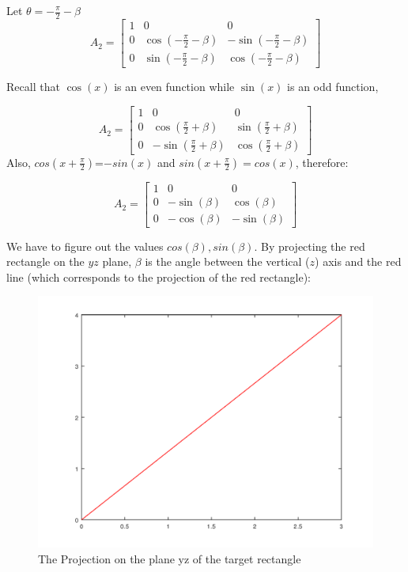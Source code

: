 \documentclass[12pt, letterpaper]{article}
\theoremstyle{statement}
\theoremstyle{statement}
\begin{document}
    Let $\theta=-\frac{\pi}{2}-\beta$
    $$
    A_2=
    \begin{bmatrix}
    1 & 0 & 0\\
    0 & \cos({-\frac{\pi}{2}-\beta}) & -\sin({-\frac{\pi}{2}-\beta}) \\
    0 & \sin({-\frac{\pi}{2}-\beta}) & \cos({-\frac{\pi}{2}-\beta})  
    \end{bmatrix}
    $$
    
    Recall that $\cos(x)$ is an even function while $\sin(x)$ is an odd function,
    
    $$
    A_2=
    \begin{bmatrix}
    1 & 0 & 0\\
    0 & \cos({\frac{\pi}{2}+\beta}) & \sin({\frac{\pi}{2}+\beta}) \\
    0 & -\sin({\frac{\pi}{2}+\beta}) & \cos({\frac{\pi}{2}+\beta})
    \end{bmatrix}
    $$
    Also, $cos(x+\frac{\pi}{2})$=$-sin(x)$ and $sin(x+\frac{\pi}{2})=cos(x)$, therefore:
    
    $$
    A_2=
    \begin{bmatrix}
    1 & 0 & 0\\
    0 & -\sin(\beta) & \cos(\beta) \\
    0 & -\cos(\beta) & -\sin(\beta) 
    \end{bmatrix}
    $$
    
    We have to figure out the values $cos(\beta), sin(\beta)$. By projecting the red rectangle on the $yz$ plane, $\beta$ is the angle between the vertical ($z$) axis and the red line (which corresponds to the projection of the red rectangle):
    
    \begin{figure}[H]
        \centering
        \includegraphics[scale=0.5]{line1.png}
        \caption{The Projection on the plane yz of the target rectangle}
        \label{fig:line1}
    \end{figure}
    
\end{document}
